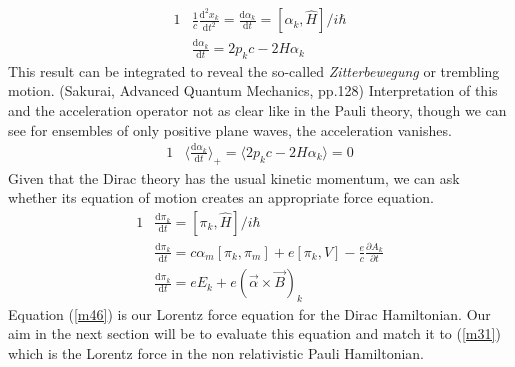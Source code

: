 \documentclass[]{article}
\numberwithin{equation}{subsection}
\begin{document}
\begin{alignat}{1}
  \label{m41}		&\frac{1}{c}\frac{\mathrm{d}^{2}x_{k}}{\mathrm{d}t^{2}}=\frac{\mathrm{d}\alpha_{k}}{\mathrm{d}t}=[\alpha_{k},\hat{H}]/i\hbar\\
  \label{m42}		&\frac{\mathrm{d}\alpha_{k}}{\mathrm{d}t}=2p_{k}c-2H\alpha_{k}
\end{alignat}
This result can be integrated to reveal the so-called \emph{Zitterbewegung} or trembling motion. (Sakurai, Advanced Quantum Mechanics, pp.128) Interpretation of this and the acceleration operator not as clear like in the Pauli theory, though we can see for ensembles of only positive plane waves, the acceleration vanishes.
\begin{alignat}{1}
  \label{m43}		&\langle\frac{\mathrm{d}\alpha_{k}}{\mathrm{d}t}\rangle_{+}=\langle2p_{k}c-2H\alpha_{k}\rangle=0
\end{alignat}
 Given that the Dirac theory has the usual kinetic momentum, we can ask whether its equation of motion creates an appropriate force equation.
\begin{alignat}{1}
  \label{m44}		&\frac{\mathrm{d}\pi_{k}}{\mathrm{d}t}=[\pi_{k},\hat{H}]/i\hbar\\
  \label{m45}		&\frac{\mathrm{d}\pi_{k}}{\mathrm{d}t}=c\alpha_{m}[\pi_{k},\pi_{m}]+e[\pi_{k},V]-\frac{e}{c}\frac{\partial A_{k}}{\partial t}\\
  \label{m46}		&\frac{\mathrm{d}\pi_{k}}{\mathrm{d}t}=e E_{k}+e(\vec{\alpha}\times\vec{B})_{k}
\end{alignat}
Equation (\ref{m46}) is our Lorentz force equation for the Dirac Hamiltonian. Our aim in the next section will be to evaluate this equation and match it to (\ref{m31}) which is the Lorentz force in the non relativistic Pauli Hamiltonian.
\end{document}
